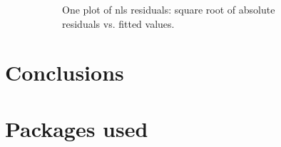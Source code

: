 \documentclass[
12pt, %
a4paper, %
oneside, %
headinclude,footinclude, %
BCOR5mm, %
]{scrartcl}
\begin{document}
\begin{figure}[H]
\begin{subfigure}{0.6\textwidth}
  \caption{One plot of nls residuals: square root of absolute residuals vs. fitted values.}
  \label{fig:logistic_smry1}
\end{subfigure}
\caption{ }
\label{fig:logistic_plots_set2}
\end{figure}

\clearpage



\section{Conclusions}





\section{Packages used}






\renewcommand{\refname}{\spacedlowsmallcaps{References}} %




\end{document}
